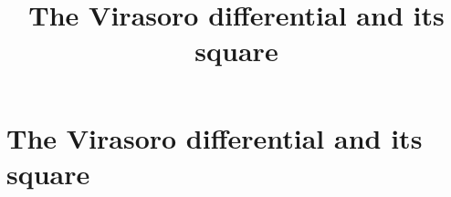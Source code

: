 \documentclass[11pt,oneside]{memoir}
\title{The Virasoro differential and its square}
\author{}
\date{}
\begin{document}
\chapter{The Virasoro differential and its square}

\end{document}
